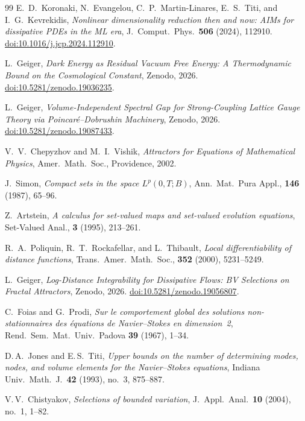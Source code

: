 \documentclass[12pt,a4paper]{article}
\theoremstyle{definition}
\theoremstyle{plain}
\theoremstyle{remark}
\begin{document}
\begin{thebibliography}{99}
E.~D.~Koronaki, N.~Evangelou, C.~P.~Martin-Linares, E.~S.~Titi, and I.~G.~Kevrekidis,
\emph{Nonlinear dimensionality reduction then and now: AIMs for dissipative PDEs in the ML era},
J.\ Comput.\ Phys.\ \textbf{506} (2024), 112910.
\href{https://doi.org/10.1016/j.jcp.2024.112910}{doi:10.1016/j.jcp.2024.112910}.

L.~Geiger,
\emph{Dark Energy as Residual Vacuum Free Energy: A Thermodynamic Bound on the Cosmological Constant},
Zenodo, 2026.
\href{https://doi.org/10.5281/zenodo.19036235}{doi:10.5281/zenodo.19036235}.

L.~Geiger,
\emph{Volume-Independent Spectral Gap for Strong-Coupling Lattice Gauge Theory via Poincar\'e--Dobrushin Machinery},
Zenodo, 2026.
\href{https://doi.org/10.5281/zenodo.19087433}{doi:10.5281/zenodo.19087433}.

V.~V.~Chepyzhov and M.~I.~Vishik, \textit{Attractors for Equations of Mathematical Physics}, Amer.\ Math.\ Soc., Providence, 2002.

J.~Simon, \textit{Compact sets in the space $L^p(0,T;B)$}, Ann.\ Mat.\ Pura Appl., \textbf{146} (1987), 65--96.

Z.~Artstein, \textit{A calculus for set-valued maps and set-valued evolution equations}, Set-Valued Anal., \textbf{3} (1995), 213--261.

R.~A.~Poliquin, R.~T.~Rockafellar, and L.~Thibault, \textit{Local differentiability of distance functions}, Trans.\ Amer.\ Math.\ Soc., \textbf{352} (2000), 5231--5249.

 L.~Geiger, \textit{Log-Distance Integrability for Dissipative Flows: BV Selections on Fractal Attractors}, Zenodo, 2026.
\href{https://doi.org/10.5281/zenodo.19056807}{doi:10.5281/zenodo.19056807}.

C.~Foias and G.~Prodi,
\emph{Sur le comportement global des solutions non-stationnaires des \'equations de Navier--Stokes en dimension~2},
Rend.\ Sem.\ Mat.\ Univ.\ Padova \textbf{39} (1967), 1--34.

D.\,A.~Jones and E.\,S.~Titi,
\emph{Upper bounds on the number of determining modes, nodes, and volume elements for the Navier--Stokes equations},
Indiana Univ.\ Math.\ J.\ \textbf{42} (1993), no.~3, 875--887.

V.\,V.~Chistyakov,
\emph{Selections of bounded variation},
J.~Appl.\ Anal.\ \textbf{10} (2004), no.~1, 1--82.


\end{thebibliography}
\end{document}
